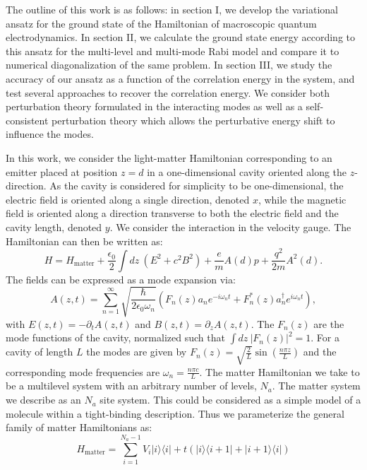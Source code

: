 \documentclass[aps,prb,twocolumn,
	groupedaddress,superscriptaddress,
	amsfonts,amssymb,amsmath,floatfix,
	citeautoscript]{revtex4-1}
\begin{document}
The outline of this work is as follows: in section I, we develop the variational ansatz for the ground state of the Hamiltonian of macroscopic quantum electrodynamics. In section II, we calculate the ground state energy according to this ansatz for the multi-level and multi-mode Rabi model and compare it to numerical diagonalization of the same problem. In section III, we study the accuracy of our ansatz as a function of the correlation energy in the system, and test several approaches to recover the correlation energy.  We consider both perturbation theory formulated in the interacting modes as well as a self-consistent perturbation theory which allows the perturbative energy shift to influence the modes.


In this work, we consider the light-matter Hamiltonian corresponding to an emitter placed at position $z=d$ in a one-dimensional cavity oriented along the $z$-direction. As the cavity is considered for simplicity to be one-dimensional, the electric field is oriented along a single direction, denoted $x$, while the magnetic field is oriented along a direction transverse to both the electric field and the cavity length, denoted $y$. We consider the interaction in the velocity gauge. The Hamiltonian can then be written as:
\begin{equation}
H = H_{\text{matter}}+\frac{\epsilon_0}{2}\int dz~(E^2+c^2B^2)+\frac{e}{m}A(d)p + \frac{q^2}{2m}A^2(d).
\end{equation}
The fields can be expressed as a mode expansion via:
\begin{equation}
A(z,t) = \sum\limits_{n=1}^{\infty} \sqrt{\frac{\hbar}{2\epsilon_0\omega_n }}(F_n(z)a_ne^{-i\omega_n t}+F^*_n(z)a_n^{\dagger}e^{i\omega_n t}),
\end{equation}
with $E(z,t) = -\partial_t A(z,t)$ and $B(z,t)=\partial_z A(z,t)$.  The $F_n(z)$ are the mode functions of the cavity, normalized such that $\int dz ~|F_n(z)|^2 = 1$. For a cavity of length $L$ the modes are given by $F_n(z) = \sqrt{\frac{2}{L}}\sin\left(\frac{n\pi z}{L} \right)$ and the corresponding mode frequencies are $\omega_n = \frac{n\pi c}{L}$. The matter Hamiltonian we take to be a multilevel system with an arbitrary number of levels, $N_a$. The matter system we describe as an $N_a$ site system. This could be considered as a simple model of a molecule within a tight-binding description. Thus we parameterize the general family of matter Hamiltonians as:
\begin{equation}
H_{\text{matter}} = \sum\limits_{i=1}^{{N_a-1}} V_i|i\rangle\langle i|+t(|i\rangle\langle i+1|+|i+1\rangle\langle i|) 
\end{equation}
\end{document}
